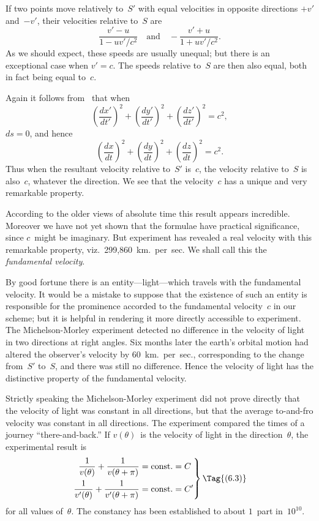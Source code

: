 \documentclass[12pt]{book}
\begin{document}
If two points move relatively to~$S'$ with equal velocities in opposite
directions $+v'$ and~$-v'$, their velocities relative to~$S$ are
\[
\frac{v' - u}{1 - u v'/c^{2}}\quad\text{and}\quad
-\frac{v' + u}{1 + u v'/c^{2}}.
\]
As we should expect, these speeds are usually unequal; but there is an exceptional
case when $v' = c$. The speeds relative to~$S$ are then also equal, both
in fact being equal to~$c$.

Again it follows from~ that when
\[
\left(\frac{dx'}{dt'}\right)^{2} + \left(\frac{dy'}{dt'}\right)^{2} + \left(\frac{dz'}{dt'}\right)^{2} = c^{2},
\]
$ds = 0$, and hence
\[
\left(\frac{dx}{dt}\right)^{2} + \left(\frac{dy}{dt}\right)^{2} + \left(\frac{dz}{dt}\right)^{2} = c^{2}.
\]
Thus when the resultant velocity relative to~$S'$ is~$c$, the velocity relative to~$S$
is also~$c$, whatever the direction. We see that the velocity~$c$ has a unique
and very remarkable property.

According to the older views of absolute time this result appears incredible.
Moreover we have not yet shown that the formulae have practical significance,
since $c$~might be imaginary. But experiment has revealed a real velocity
with this remarkable property, viz.\ 299,860~km.\ per~sec. We shall call this
the \emph{fundamental velocity}.
%
%

By good fortune there is an entity---light---which travels with the fundamental
%
velocity. It would be a mistake to suppose that the existence of such
an entity is responsible for the prominence accorded to the fundamental velocity~$c$
in our scheme; but it is helpful in rendering it more directly accessible to
experiment. The Michelson-Morley experiment detected no difference in the
%
velocity of light in two directions at right angles. Six months later the earth's
%
orbital motion had altered the observer's velocity by 60~km.\ per~sec., corresponding
to the change from~$S'$ to~$S$, and there was still no difference. Hence
the velocity of light has the distinctive property of the fundamental velocity.

Strictly speaking the Michelson-Morley experiment did not prove directly
that the velocity of light was constant in all directions, but that the average
to-and-fro velocity was constant in all directions. The experiment compared
the times of a journey ``there-and-back.'' If $v(\theta)$~is the velocity of light in
the direction~$\theta$, the experimental result is
\[
\left.
\begin{alignedat}{2}
  \frac{1}{v(\theta)} + \frac{1}{v(\theta + \pi)} &= \text{const.} &&= C \\
  \frac{1}{v'(\theta)} + \frac{1}{v'(\theta + \pi)} &= \text{const.} &&= C'
\end{alignedat}
\right\}
\Tag{(6.3)}
\]
for all values of~$\theta$. The constancy has been established to about $1$~part in~$10^{10}$.
\end{document}
